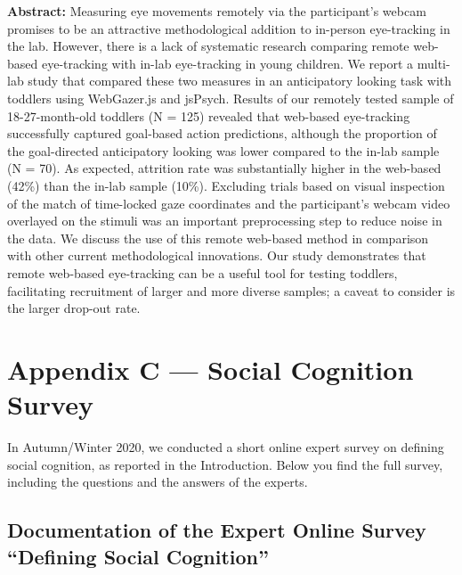 \documentclass[
]{scrbook}
\begin{document}
\textbf{Abstract:} Measuring eye movements remotely via the participant's webcam promises to be an attractive methodological addition to in-person eye-tracking in the lab. However, there is a lack of systematic research comparing remote web-based eye-tracking with in-lab eye-tracking in young children. We report a multi-lab study that compared these two measures in an anticipatory looking task with toddlers using WebGazer.js and jsPsych. Results of our remotely tested sample of 18-27-month-old toddlers (N = 125) revealed that web-based eye-tracking successfully captured goal-based action predictions, although the proportion of the goal-directed anticipatory looking was lower compared to the in-lab sample (N = 70). As expected, attrition rate was substantially higher in the web-based (42\%) than the in-lab sample (10\%). Excluding trials based on visual inspection of the match of time-locked gaze coordinates and the participant's webcam video overlayed on the stimuli was an important preprocessing step to reduce noise in the data. We discuss the use of this remote web-based method in comparison with other current methodological innovations. Our study demonstrates that remote web-based eye-tracking can be a useful tool for testing toddlers, facilitating recruitment of larger and more diverse samples; a caveat to consider is the larger drop-out rate.

\chapter*{Appendix C --- Social Cognition Survey}\label{appendixC}

In Autumn/Winter 2020, we conducted a short online expert survey on defining social cognition, as reported in the Introduction. Below you find the full survey, including the questions and the answers of the experts.

\section*{Documentation of the Expert Online Survey ``Defining Social Cognition''}\label{social-cognition-survey}

\begin{minipage}{\textwidth}

\end{minipage}
\end{document}
